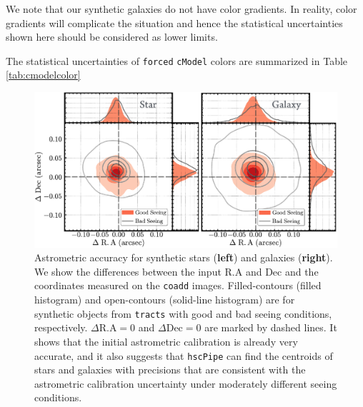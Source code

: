 \documentclass[useamsfonts]{pasj01}
\def\hscpipe{\texttt{hscPipe}}
\def\cmodel{\texttt{cModel}}
\def\forced{\texttt{forced}}
\def\coadd{\texttt{coadd}}
\def\tracts{\texttt{tracts}}
\begin{document}
    We note that our synthetic galaxies do not have color gradients.  
    In reality, color gradients will complicate the situation and hence the statistical 
    uncertainties shown here should be considered as lower limits.

	The statistical uncertainties of \forced{} \cmodel{} colors are summarized in 
	Table \ref{tab:cmodelcolor}
    


\begin{figure}
    \begin{center}
        \includegraphics[width=\textwidth]{fig/synpipe_astrometry}
    \end{center}
    \caption{
        Astrometric accuracy for synthetic stars (\textbf{left}) and galaxies
        (\textbf{right}). 
        We show the differences between the input R.A and Dec and the coordinates 
        measured on the \coadd{} images. 
        Filled-contours (filled histogram) and open-contours (solid-line histogram) are 
        for synthetic objects from \tracts{} with good and bad seeing conditions, 
        respectively.
        $\Delta\mathrm{R.A}=0$ and $\Delta\mathrm{Dec}=0$ are marked by dashed lines.     
        It shows that the initial astrometric calibration is already very accurate,  
        and it also suggests that \hscpipe{} can find the centroids of stars and 
        galaxies with precisions that are consistent with the astrometric calibration
        uncertainty under moderately different seeing conditions.
        }
    \label{fig:astrometry}
\end{figure}
\end{document}
